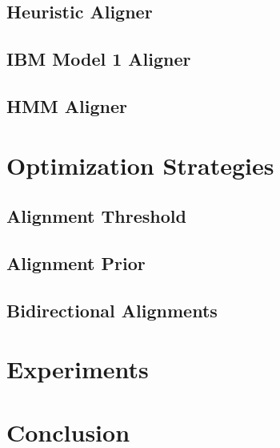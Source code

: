 \documentclass[11pt,letterpaper]{article}
\begin{document}
\subsection{Heuristic Aligner}

\subsection{IBM Model 1 Aligner}

\subsection{HMM Aligner}

\section{Optimization Strategies}

\subsection{Alignment Threshold}

\subsection{Alignment Prior}

\subsection{Bidirectional Alignments}

\section{Experiments}

\section{Conclusion}

\vspace{1em} 
%
%
%

 
\appendix
\end{document}
